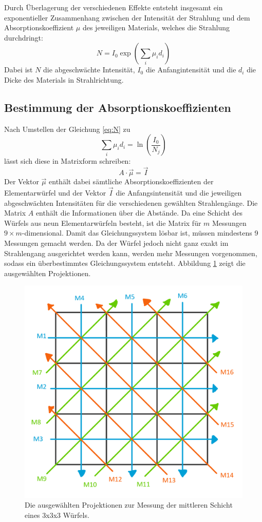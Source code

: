 Durch Überlagerung der verschiedenen Effekte entsteht insgesamt ein exponentieller Zusammenhang zwischen der Intensität der Strahlung und dem
Absorptionskoeffizient $\mu$ des jeweiligen Materials, welches die Strahlung durchdringt:
\begin{equation}
  N = I_0 \exp\left( \sum_i \mu_i d_i \right)
  \label{eq:N}
\end{equation}
Dabei ist $N$ die abgeschwächte Intensität, $I_0$ die Anfangintensität und die $d_i$ die Dicke des Materials in Strahlrichtung.

\subsection{Bestimmung der Absorptionskoeffizienten}
Nach Umstellen der Gleichung \eqref{eq:N} zu
\begin{equation}
  \sum_i\mu_i d_i = \ln\left(\frac{I_0}{N_j}\right)
\end{equation}
lässt sich diese in Matrixform schreiben:
\begin{equation}
  A\cdot\vec{\mu} = \vec{I}
\end{equation}
Der Vektor $\vec{\mu}$ enthält dabei sämtliche Absorptionskoeffizienten der Elementarwürfel und der Vektor $\vec{I}$ die Anfangsintensität und die jeweiligen abgeschwächten
Intensitäten für die verschiedenen gewählten Strahlengänge. Die Matrix $A$ enthält die Informationen über die Abstände. Da eine Schicht des Würfels aus
neun Elementarwürfeln besteht, ist die Matrix für $m$ Messungen $9\times m$-dimensional. Damit das Gleichungssystem lösbar ist, müssen mindestens 9
Messungen gemacht werden. Da der Würfel jedoch nicht ganz exakt im Strahlengang ausgerichtet werden kann, werden mehr Messungen vorgenommen, sodass ein
überbestimmtes Gleichungssystem entsteht. Abbildung \ref{fig:wuerfel} zeigt die ausgewählten Projektionen.

\begin{figure}
  \centering
  \includegraphics[scale=0.5]{graphics/wuerfel.png}
  \caption{Die ausgewählten Projektionen zur Messung der mittleren Schicht eines 3x3x3 Würfels.}
  \label{fig:wuerfel}
\end{figure}
